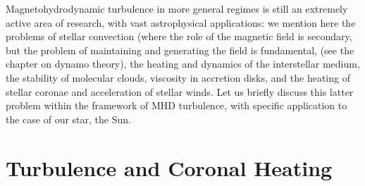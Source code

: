 \documentclass[12pt,a4paper]{article}
\begin{document}
Magnetohydrodynamic turbulence in more general regimes is still an extremely active area of research, with vast astrophysical applications: we mention here the problems of stellar convection (where the role of the magnetic field is secondary, but the problem of maintaining and generating the field is fundamental, (see the chapter on dynamo theory), the heating and dynamics of the interstellar medium, the stability of molecular clouds, viscosity in accretion disks, and the heating of stellar coronae and acceleration of stellar winds. Let us briefly discuss this latter problem within the framework of MHD turbulence, with specific application to the case of our star, the Sun.




















\section{Turbulence and Coronal Heating}






















\cite{2013ASSL..388.....F}



































\end{document}
